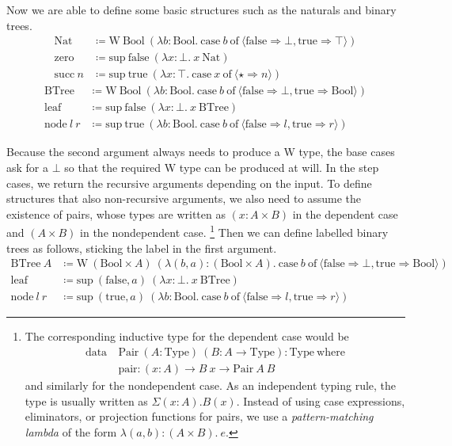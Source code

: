 \documentclass{report}
\newcommand{\Nat}{\const{Nat}}
\newcommand{\zero}{\const{zero}}
\renewcommand{\succ}{\const{succ}}
\newcommand{\BTree}{\const{BTree}}
\newcommand{\leaf}{\const{leaf}}
\newcommand{\node}{\const{node}}
\newcommand{\Bool}{\const{Bool}}
\newcommand{\true}{\const{true}}
\newcommand{\false}{\const{false}}
\newcommand{\W}{\const{W}}
\renewcommand{\sup}{\const{sup}}
\newcommand{\const}[1]{\text{#1}}
\newcommand{\data}{\const{data}}
\newcommand{\Type}{\const{Type}}
\newcommand{\where}{\const{where}}
\newcommand{\case}{\const{case}}
\newcommand{\of}{\const{of}}
\begin{document}
Now we are able to define some basic structures such as the naturals and binary trees.
%
\begin{align*}
    \Nat &\coloneqq \W ~ \Bool ~ (\lambda b: \Bool. ~ \case ~ b ~ \of ~ \langle \false \Rightarrow \bot, \true \Rightarrow \top \rangle) \\
    \zero &\coloneqq \sup ~ \false ~ (\lambda x: \bot. ~ x ~ \Nat) \\
    \succ ~ n &\coloneqq \sup ~ \true ~ (\lambda x: \top. ~ \case ~ x ~ \of ~ \langle \star \Rightarrow n \rangle)
\end{align*}
\begin{align*}
    \BTree &\coloneqq \W ~ \Bool ~ (\lambda b: \Bool. ~ \case ~ b ~ \of ~ \langle \false \Rightarrow \bot, \true \Rightarrow \Bool \rangle) \\
    \leaf &\coloneqq \sup ~ \false ~ (\lambda x: \bot. ~ x ~ \BTree) \\
    \node ~ l ~ r &\coloneqq \sup ~ \true ~ (\lambda b: \Bool. ~ \case ~ b ~ \of ~ \langle \false \Rightarrow l, \true \Rightarrow r \rangle)
\end{align*}

Because the second argument always needs to produce a W type, the base cases ask for a $\bot$ so that the required W type can be produced at will. In the step cases, we return the recursive arguments depending on the input. To define structures that also non-recursive arguments, we also need to assume the existence of pairs, whose types are written as $(x: A \times B)$ in the dependent case
and $(A \times B)$ in the nondependent case.%
\footnote{The corresponding inductive type for the dependent case would be
\begin{align*}
    \data ~ &\const{Pair} ~ (A: \Type) ~ (B: A \to \Type): \Type ~ \where \\
    &\const{pair}: (x: A) \to B ~ x \to \const{Pair} ~ A ~ B
\end{align*}
and similarly for the nondependent case. As an independent typing rule, the type is usually written as $\Sigma(x:A).B(x)$. Instead of using case expressions, eliminators, or projection functions for pairs, we use a \emph{pattern-matching lambda} of the form $\lambda(a, b): (A \times B). ~ e$.}
Then we can define labelled binary trees as follows, sticking the label in the first argument.
%
\begin{align*}
    \BTree ~ A &\coloneqq \W ~ (\Bool \times A) ~ (\lambda (b, a): (\Bool \times A). ~ \case ~ b ~ \of ~ \langle \false \Rightarrow \bot, \true \Rightarrow \Bool \rangle) \\
    \leaf &\coloneqq \sup ~ (\false, a) ~ (\lambda x: \bot. ~ x ~ \BTree) \\
    \node ~ l ~ r &\coloneqq \sup ~ (\true, a) ~ (\lambda b: \Bool. ~ \case ~ b ~ \of ~ \langle \false \Rightarrow l, \true \Rightarrow r \rangle)
\end{align*}
\end{document}

